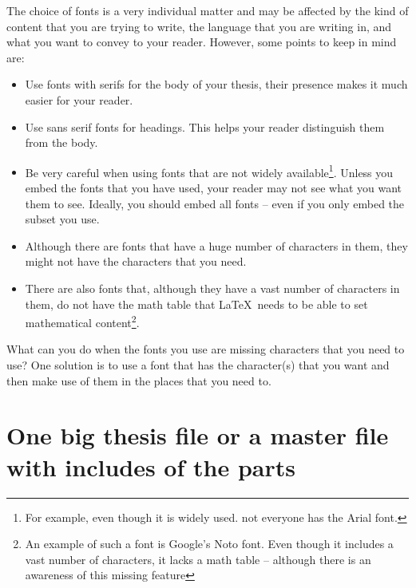 \documentclass[examplethesis.tex]{subfiles}
\begin{document}
The choice of fonts is a very individual matter and may be affected by the kind of content that you are trying to write, the language that you are writing in, and what you want to convey to your reader. However, some points to keep in mind are:
\begin{itemize}
    \item Use fonts with serifs for the body of your thesis, their presence makes it much easier for your reader.

    \item Use sans serif fonts for headings. This helps your reader distinguish them from the body.

    \item Be very careful when using fonts that are not widely available\footnote{For example, even though it is widely used. not everyone has the Arial font.}. Unless you embed the fonts that you have used, your reader may not see what you want them to see. Ideally, you should embed all fonts -- even if you only embed the subset you use.

    \item Although there are fonts that have a huge number of characters in them, they might not have the characters that you need.

    \item There are also fonts that, although they have a vast number of characters in them, do not have the math table that \LaTeX\ needs to be able to set mathematical content\footnote{An example of such a font is Google's Noto font. Even though it includes a vast number of characters, it lacks a math table -- although there is an awareness of this missing feature}.
\end{itemize}

What can you do when the fonts you use are missing characters that you need to use? One solution is to use a font that has the character(s) that you want and then make use of them in the places that you need to.


\section{One big thesis file or a master file with includes of the parts}
\label{sec:onebigFIlevsincludes}
\end{document}

